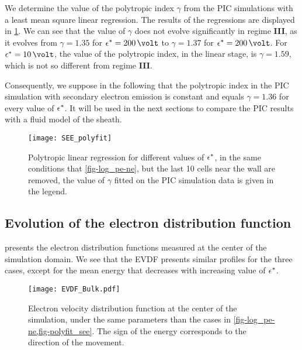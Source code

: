 We determine the value of the polytropic index $\gamma$ from the \ac{PIC} simulations with a least mean square linear regression.
The results of the regressions are displayed in \cref{fig-polyfit_see}.
We can see that the value of $\gamma$ does not evolve significantly in regime {\bf III}, as it evolves from $\gamma=1.35$ for $\crover=200\,\volt$ to $\gamma=1.37$ for $\crover=200\,\volt$.
For $\crover=10\,\volt$, the value of the polytropic index, in the linear stage, is $\gamma=1.59$, which is not so different from regime {\bf III}.

Consequently, we suppose in the following that the polytropic index in the \ac{PIC} simulation with secondary electron emission is constant and equals $\gamma=1.36$ for every value of $\epsilon^{*}$.
It will be used in the next sections to compare the \ac{PIC} results with a fluid model of the sheath.

\renewcommand\subfigurewidth{3in}

\begin{figure}[hbtp]
  \centering
  \texttt{[image: SEE\_polyfit]}
  \caption{Polytropic linear regression for different values of $\epsilon^{*}$, in the same conditions that \cref{fig-log_pe-ne}, but the last 10 cells near the wall are removed, the value of $\gamma$ fitted on the \ac{PIC} simulation data is given in the legend.}
  \label{fig-polyfit_see}
\end{figure}


\subsection{Evolution of the electron distribution function} \label{subsec-EVDF_see_polyfit}

 presents the electron distribution functions measured at the center of the simulation domain. 
We see that the \ac{EVDF} presents similar profiles for the three cases, except for the mean energy that decreases with increasing value of $\epsilon^{*}$.

\begin{figure}[hbtp]
  \centering
  \texttt{[image: EVDF\_Bulk.pdf]}
  \caption{Electron velocity distribution function at the center of the simulation, under the same parameters than the cases in \cref{fig-log_pe-ne,fig-polyfit_see}. The sign of the energy corresponds to the direction of the movement.}
  \label{fig-evdf_epsstar}
\end{figure}


